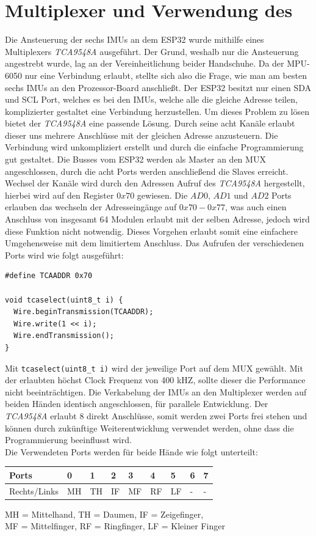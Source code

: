 \section{Multiplexer und Verwendung des \iic}\label{MUX}
Die Ansteuerung der sechs IMUs an dem ESP32 wurde mithilfe eines Multiplexers \textit{TCA9548A} ausgeführt. Der Grund, weshalb nur die \iic Ansteuerung angestrebt wurde, lag an der Vereinheitlichung beider Handschuhe. Da der MPU-6050 nur eine \iic Verbindung erlaubt, stellte sich also die Frage, wie man am besten sechs IMUs an den Prozessor-Board anschließt. 
Der ESP32 besitzt nur einen SDA und SCL Port, welches es bei den IMUs, welche alle die gleiche Adresse teilen, komplizierter gestaltet eine Verbindung herzustellen. 
Um dieses Problem zu lösen bietet der \textit{TCA9548A} eine passende Lösung. Durch seine acht Kanäle erlaubt dieser uns mehrere \iic Anschlüsse mit der gleichen Adresse anzusteuern. 
Die Verbindung wird unkompliziert erstellt und durch die einfache Programmierung gut gestaltet. Die \iic Busses vom ESP32 werden als Master an den MUX angeschlossen, durch die acht Ports werden anschließend die Slaves erreicht.
Wechsel der Kanäle wird durch den Adressen Aufruf des \textit{TCA9548A} hergestellt, hierbei wird auf den Register $0x70$ gewiesen. Die $AD0$, $AD1$ und $AD2$ Ports erlauben das wechseln der Adresseingänge auf $0x70 - 0x77$, was auch einen Anschluss von insgesamt 64 Modulen erlaubt mit der selben Adresse, jedoch wird diese Funktion nicht notwendig. Dieses Vorgehen erlaubt somit eine einfachere Umgehensweise mit dem limitiertem \iic Anschluss.
Das Aufrufen der verschiedenen Ports wird wie folgt ausgeführt:
\begin{lstlisting}
#define TCAADDR 0x70

void tcaselect(uint8_t i) {
  Wire.beginTransmission(TCAADDR);
  Wire.write(1 << i);
  Wire.endTransmission();
}
\end{lstlisting}
Mit \lstinline{tcaselect(uint8_t i)} wird der jeweilige Port auf dem MUX gewählt. Mit der erlaubten höchst Clock Frequenz von 400 kHZ, sollte dieser die Performance nicht beeinträchtigen. Die Verkabelung der IMUs an den Multiplexer werden auf beiden Händen identisch angeschlossen, für parallele Entwicklung. Der \textit{TCA9548A} erlaubt 8 direkt Anschlüsse, somit werden zwei Ports frei stehen und können durch zukünftige Weiterentwicklung verwendet werden, ohne dass die Programmierung beeinflusst wird. \\
Die Verwendeten Ports werden für beide Hände wie folgt unterteilt:
\begin{center}
    \begin{tabular}{  p{3cm} | p{1cm} | p{1cm} | p{1cm} | p{1cm} | p{1cm} | p{1cm} | p{1cm} | p{1cm} }
    \hline
    Ports & 0 & 1 & 2 & 3 & 4 & 5 & 6 & 7 \\ \hline
    Rechts/Links & MH & TH & IF & MF & RF & LF & - & - \\
    \end{tabular}
    MH = Mittelhand, TH = Daumen, IF = Zeigefinger, \\
    MF = Mittelfinger, RF = Ringfinger, LF = Kleiner Finger
\end{center}



